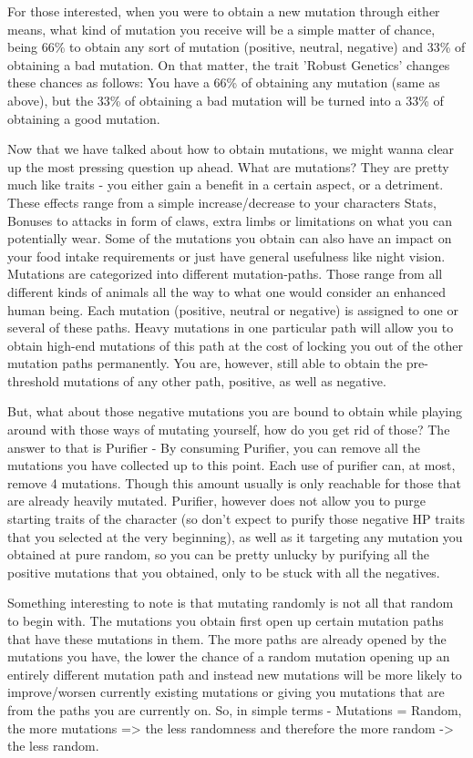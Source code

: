 \documentclass[11pt]{report}
\begin{document}
For those interested, when you were to obtain a new mutation through either means, what kind of mutation you receive will be a simple matter of chance, being 66\% to obtain any sort of mutation (positive, neutral, negative) and 33\% of obtaining a bad mutation.
On that matter, the trait 'Robust Genetics' changes these chances as follows: You have a 66\% of obtaining any mutation (same as above), but the 33\% of obtaining a bad mutation will be turned into a 33\% of obtaining a good mutation.

Now that we have talked about how to obtain mutations, we might wanna clear up the most pressing question up ahead. What are mutations?
They are pretty much like traits - you either gain a benefit in a certain aspect, or a detriment. These effects range from a simple increase/decrease to your characters Stats, Bonuses to attacks in form of claws, extra limbs or limitations on what you can potentially wear. Some of the mutations you obtain can also have an impact on your food intake requirements or just have general usefulness like night vision. Mutations are categorized into different mutation-paths. Those range from all different kinds of animals all the way to what one would consider an enhanced human being. Each mutation (positive, neutral or negative) is assigned to one or several of these paths. Heavy mutations in one particular path will allow you to obtain high-end mutations of this path at the cost of locking you out of the other mutation paths permanently. You are, however, still able to obtain the pre-threshold mutations of any other path, positive, as well as negative.

But, what about those negative mutations you are bound to obtain while playing around with those ways of mutating yourself, how do you get rid of those? The answer to that is Purifier - By consuming Purifier, you can remove all the mutations you have collected up to this point. Each use of purifier can, at most, remove 4 mutations. Though this amount usually is only reachable for those that are already heavily mutated. Purifier, however does not allow you to purge starting traits of the character (so don't expect to purify those negative HP traits that you selected at the very beginning), as well as it targeting any mutation you obtained at pure random, so you can be pretty unlucky by purifying all the positive mutations that you obtained, only to be stuck with all the negatives.

Something interesting to note is that mutating randomly is not all that random to begin with. The mutations you obtain first open up certain mutation paths that have these mutations in them. The more paths are already opened by the mutations you have, the lower the chance of a random mutation opening up an entirely different mutation path and instead new mutations will be more likely to improve/worsen currently existing mutations or giving you mutations that are from the paths you are currently on. So, in simple terms - Mutations = Random, the more mutations => the less randomness and therefore the more random -> the less random.
\end{document}
